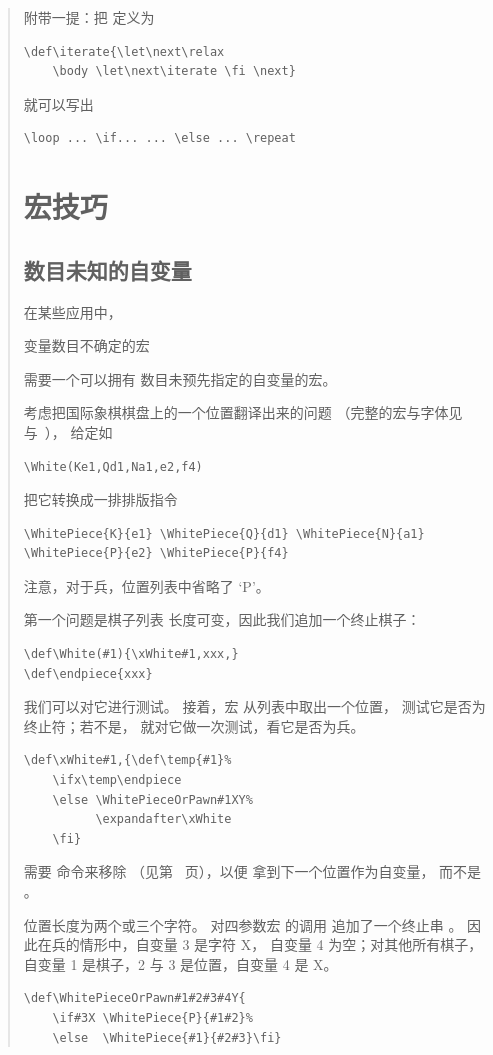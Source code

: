 \documentclass[a4paper]{rapport3}
\newenvironment{disp}{\begin{quotation}}{\end{quotation}}
\def\howto#1\par{}
\begin{document}
\begin{disp}
附带一提：把  定义为
\begin{verbatim}
\def\iterate{\let\next\relax 
    \body \let\next\iterate \fi \next}
\end{verbatim}
就可以写出
\begin{verbatim}
\loop ... \if... ... \else ... \repeat
\end{verbatim}

\section{宏技巧}

\subsection{数目未知的自变量}

在某些应用中，
\howto 自变量数目不确定的宏\par
需要一个可以拥有
数目未预先指定的自变量的宏。

考虑把国际象棋棋盘上的一个位置翻译出来的问题
（完整的宏与字体见~\cite{chess} 与~\cite{Tut}），
给定如
\begin{verbatim}
\White(Ke1,Qd1,Na1,e2,f4)
\end{verbatim} 
把它转换成一排排版指令
\begin{verbatim}
\WhitePiece{K}{e1} \WhitePiece{Q}{d1} \WhitePiece{N}{a1} 
\WhitePiece{P}{e2} \WhitePiece{P}{f4}
\end{verbatim}
注意，对于兵，位置列表中省略了 `P'。

第一个问题是棋子列表
长度可变，因此我们追加一个终止棋子：
\begin{verbatim}
\def\White(#1){\xWhite#1,xxx,}
\def\endpiece{xxx}
\end{verbatim}
我们可以对它进行测试。
接着，宏  从列表中取出一个位置，
测试它是否为终止符；若不是，
就对它做一次测试，看它是否为兵。
\begin{verbatim}
\def\xWhite#1,{\def\temp{#1}%
    \ifx\temp\endpiece 
    \else \WhitePieceOrPawn#1XY%
          \expandafter\xWhite 
    \fi}
\end{verbatim}
需要  命令来移除
（见第~\pageref{after:cond} 页），以便
 拿到下一个位置作为自变量，
而不是 。

位置长度为两个或三个字符。
对四参数宏  的调用
追加了一个终止串 。
因此在兵的情形中，自变量 3 是字符 \n X，
自变量 4 为空；对其他所有棋子，自变量 1
是棋子，2 与 3 是位置，自变量 4 是 \n X。
\begin{verbatim}
\def\WhitePieceOrPawn#1#2#3#4Y{
    \if#3X \WhitePiece{P}{#1#2}%
    \else  \WhitePiece{#1}{#2#3}\fi}
\end{verbatim}


\end{disp}
\end{document}
